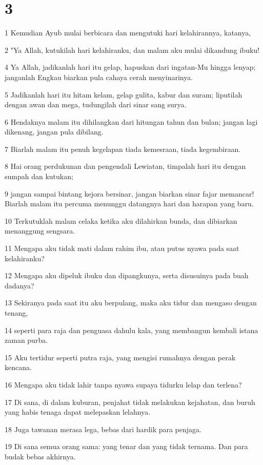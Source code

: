 \chapter{3}

\par 1 Kemudian Ayub mulai berbicara dan mengutuki hari kelahirannya, katanya,
\par 2 "Ya Allah, kutukilah hari kelahiranku, dan malam aku mulai dikandung ibuku!
\par 4 Ya Allah, jadikanlah hari itu gelap, hapuskan dari ingatan-Mu hingga lenyap; janganlah Engkau biarkan pula cahaya cerah menyinarinya.
\par 5 Jadikanlah hari itu hitam kelam, gelap gulita, kabur dan suram; liputilah dengan awan dan mega, tudungilah dari sinar sang surya.
\par 6 Hendaknya malam itu dihilangkan dari hitungan tahun dan bulan; jangan lagi dikenang, jangan pula dibilang.
\par 7 Biarlah malam itu penuh kegelapan tiada kemesraan, tiada kegembiraan.
\par 8 Hai orang perdukunan dan pengendali Lewiatan, timpalah hari itu dengan sumpah dan kutukan;
\par 9 jangan sampai bintang kejora bersinar, jangan biarkan sinar fajar memancar! Biarlah malam itu percuma menunggu datangnya hari dan harapan yang baru.
\par 10 Terkutuklah malam celaka ketika aku dilahirkan bunda, dan dibiarkan menanggung sengsara.
\par 11 Mengapa aku tidak mati dalam rahim ibu, atau putus nyawa pada saat kelahiranku?
\par 12 Mengapa aku dipeluk ibuku dan dipangkunya, serta disusuinya pada buah dadanya?
\par 13 Sekiranya pada saat itu aku berpulang, maka aku tidur dan mengaso dengan tenang,
\par 14 seperti para raja dan penguasa dahulu kala, yang membangun kembali istana zaman purba.
\par 15 Aku tertidur seperti putra raja, yang mengisi rumahnya dengan perak kencana.
\par 16 Mengapa aku tidak lahir tanpa nyawa supaya tidurku lelap dan terlena?
\par 17 Di sana, di dalam kuburan, penjahat tidak melakukan kejahatan, dan buruh yang habis tenaga dapat melepaskan lelahnya.
\par 18 Juga tawanan merasa lega, bebas dari hardik para penjaga.
\par 19 Di sana semua orang sama: yang tenar dan yang tidak ternama. Dan para budak bebas akhirnya.
